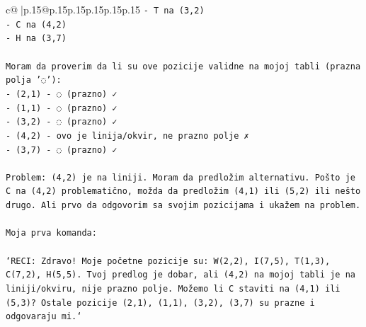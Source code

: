 \documentclass{article}
\begin{document}
{\begin{supertabular}{c@{$\;$}|p{.15\linewidth}@{}p{.15\linewidth}p{.15\linewidth}p{.15\linewidth}p{.15\linewidth}p{.15\linewidth}}
{{{\texttt{{-} T na (3,2)} \\
\texttt{{-} C na (4,2)} \\
\texttt{{-} H na (3,7)} \\
\\ 
\texttt{Moram da proverim da li su ove pozicije validne na mojoj tabli (prazna polja '◌'):} \\
\texttt{{-} (2,1) {-} ◌ (prazno) ✓} \\
\texttt{{-} (1,1) {-} ◌ (prazno) ✓} \\
\texttt{{-} (3,2) {-} ◌ (prazno) ✓} \\
\texttt{{-} (4,2) {-} ovo je linija/okvir, ne prazno polje ✗} \\
\texttt{{-} (3,7) {-} ◌ (prazno) ✓} \\
\\ 
\texttt{Problem: (4,2) je na liniji. Moram da predložim alternativu. Pošto je C na (4,2) problematično, možda da predložim (4,1) ili (5,2) ili nešto drugo. Ali prvo da odgovorim sa svojim pozicijama i ukažem na problem.} \\
\\ 
\texttt{Moja prva komanda:} \\
\\ 
\texttt{`RECI: Zdravo! Moje početne pozicije su: W(2,2), I(7,5), T(1,3), C(7,2), H(5,5). Tvoj predlog je dobar, ali (4,2) na mojoj tabli je na liniji/okviru, nije prazno polje. Možemo li C staviti na (4,1) ili (5,3)? Ostale pozicije (2,1), (1,1), (3,2), (3,7) su prazne i odgovaraju mi.`} \\
            }
        }
    }
     \\ \\


\end{supertabular}}
\end{document}
